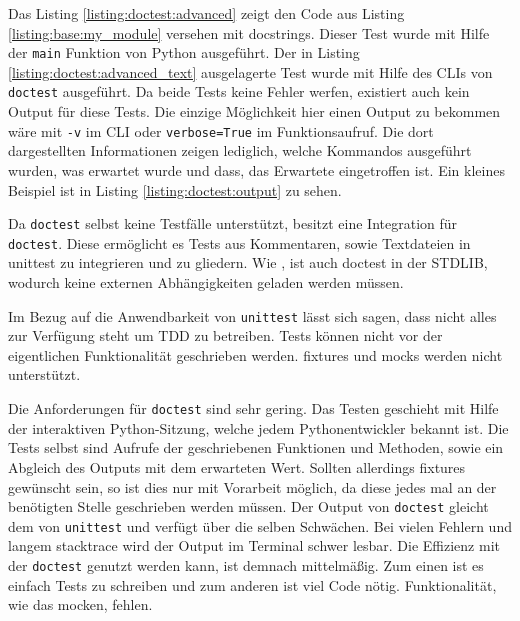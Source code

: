 Das Listing \ref{listing:doctest:advanced} zeigt den Code aus Listing
\ref{listing:base:my_module} versehen mit \Glspl{docstring}. Dieser Test wurde
mit Hilfe der \lstinline{main} Funktion von Python ausgeführt. Der in Listing
\ref{listing:doctest:advanced_text} ausgelagerte Test wurde mit Hilfe des CLIs
von \lstinline{doctest} ausgeführt. Da beide Tests keine Fehler werfen, 
existiert auch kein Output für diese Tests.
Die einzige Möglichkeit hier einen Output zu bekommen wäre mit \lstinline{-v} im
CLI oder \lstinline{verbose=True} im Funktionsaufruf. Die dort dargestellten
Informationen zeigen lediglich, welche Kommandos ausgeführt wurden, was erwartet
wurde und dass, das Erwartete eingetroffen ist. Ein kleines Beispiel ist in
Listing \ref{listing:doctest:output} zu sehen.

Da \lstinline{doctest} selbst keine Testfälle unterstützt, besitzt
 eine Integration für \lstinline{doctest}.
Diese ermöglicht es Tests aus Kommentaren, sowie Textdateien in unittest zu
integrieren und zu gliedern. Wie , ist auch
doctest in der STDLIB, wodurch keine externen Abhängigkeiten geladen werden
müssen.
\newline

Im Bezug auf die Anwendbarkeit von \lstinline{unittest} lässt sich sagen, dass
nicht alles zur Verfügung steht um TDD zu betreiben. Tests können nicht vor der
eigentlichen Funktionalität geschrieben werden. \Glspl{fixture} und 
\Glspl{mock} werden nicht unterstützt.

Die Anforderungen für \lstinline{doctest} sind sehr gering. Das Testen geschieht
mit Hilfe der interaktiven Python-Sitzung, welche jedem Pythonentwickler
bekannt ist. Die Tests selbst sind Aufrufe der geschriebenen Funktionen und
Methoden, sowie ein Abgleich des Outputs mit dem erwarteten Wert. Sollten
allerdings \Glspl{fixture} gewünscht sein, so ist dies nur mit Vorarbeit
möglich, da diese jedes mal an der benötigten Stelle geschrieben werden müssen.
Der Output von \lstinline{doctest} gleicht dem von \lstinline{unittest} und
verfügt über die selben Schwächen. Bei vielen Fehlern und langem
\gls{stacktrace} wird der Output im Terminal schwer lesbar. Die Effizienz mit
der \lstinline{doctest} genutzt werden kann, ist demnach mittelmäßig. Zum einen
ist es einfach Tests zu schreiben und zum anderen ist viel Code nötig.
Funktionalität, wie das \gls{mock}en, fehlen.


